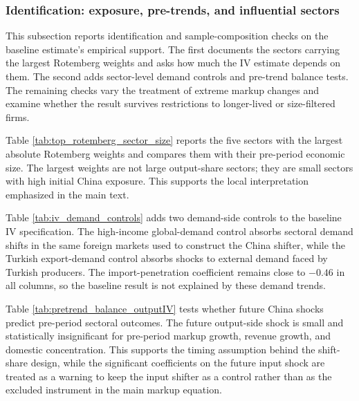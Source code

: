 ﻿\documentclass[12pt]{article}
\begin{document}
\subsubsection{Identification: exposure, pre-trends, and influential sectors}
\scriptsize
\renewcommand{\arraystretch}{0.9}

This subsection reports identification and sample-composition checks on the baseline estimate's empirical support. The first documents the sectors carrying the largest Rotemberg weights and asks how much the IV estimate depends on them. The second adds sector-level demand controls and pre-trend balance tests. The remaining checks vary the treatment of extreme markup changes and examine whether the result survives restrictions to longer-lived or size-filtered firms.



Table \ref{tab:top_rotemberg_sector_size} reports the five sectors with the largest absolute Rotemberg weights and compares them with their pre-period economic size. The largest weights are not large output-share sectors; they are small sectors with high initial China exposure. This supports the local interpretation emphasized in the main text.



Table \ref{tab:iv_demand_controls} adds two demand-side controls to the baseline IV specification. The high-income global-demand control absorbs sectoral demand shifts in the same foreign markets used to construct the China shifter, while the Turkish export-demand control absorbs shocks to external demand faced by Turkish producers. The import-penetration coefficient remains close to $-0.46$ in all columns, so the baseline result is not explained by these demand trends.



Table \ref{tab:pretrend_balance_outputIV} tests whether future China shocks predict pre-period sectoral outcomes. The future output-side shock is small and statistically insignificant for pre-period markup growth, revenue growth, and domestic concentration. This supports the timing assumption behind the shift-share design, while the significant coefficients on the future input shock are treated as a warning to keep the input shifter as a control rather than as the excluded instrument in the main markup equation.
\end{document}
